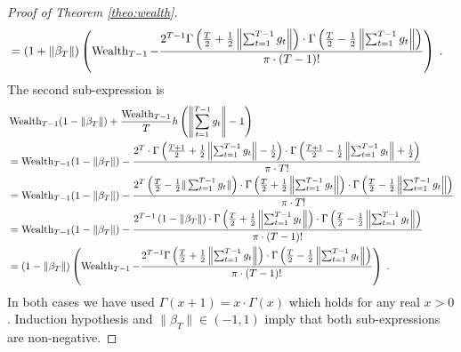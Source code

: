 \begin{proof}[Proof of Theorem \ref{theo:wealth}]
\begin{align*}
& =  (1 + \|\beta_T\|) \left( \operatorname{Wealth}_{T-1} - \frac{2^{T-1} \Gamma \left(\frac{T}{2} + \frac{1}{2}\left\|\sum_{t=1}^{T-1} g_t \right\| \right) \cdot \Gamma \left(\frac{T}{2} - \frac{1}{2} \left\|\sum_{t=1}^{T-1} g_t \right\| \right)}{\pi \cdot (T-1)!} \right) \; .
\end{align*}
The second sub-expression is
\begin{align*}
& \operatorname{Wealth}_{T-1} (1 - \| \beta_T \|) + \frac{\operatorname{Wealth}_{T-1}}{T} h\left(\left\|\sum_{t=1}^{T-1} g_t \right\| - 1 \right) \\
& = \operatorname{Wealth}_{T-1} (1 - \|\beta_T\|) - \frac{2^T \cdot \Gamma \left(\frac{T+1}{2} + \frac{1}{2}\left\|\sum_{t=1}^{T-1} g_t \right\| - \frac{1}{2} \right) \cdot \Gamma \left(\frac{T+1}{2} - \frac{1}{2} \left\|\sum_{t=1}^{T-1} g_t \right\| + \frac{1}{2} \right)}{\pi \cdot T!} \\
& = \operatorname{Wealth}_{T-1} (1 - \|\beta_T\|) - \frac{2^T \left( \frac{T}{2} - \frac{1}{2}\|\sum_{t=1}^{T-1} g_t\| \right) \cdot \Gamma \left(\frac{T}{2} + \frac{1}{2}\left\|\sum_{t=1}^{T-1} g_t \right\| \right) \cdot \Gamma \left(\frac{T}{2} - \frac{1}{2} \left\|\sum_{t=1}^{T-1} g_t \right\| \right)}{\pi \cdot T!} \\
& = \operatorname{Wealth}_{T-1} (1 - \|\beta_T\|) - \frac{2^{T-1} \left( 1 - \|\beta_T\| \right) \cdot \Gamma \left(\frac{T}{2} + \frac{1}{2}\left\|\sum_{t=1}^{T-1} g_t \right\| \right) \cdot \Gamma \left(\frac{T}{2} - \frac{1}{2} \left\|\sum_{t=1}^{T-1} g_t \right\| \right)}{\pi \cdot (T-1)!} \\
& = (1 - \|\beta_T\|) \left( \operatorname{Wealth}_{T-1}  - \frac{2^{T-1} \Gamma \left(\frac{T}{2} + \frac{1}{2}\left\|\sum_{t=1}^{T-1} g_t \right\| \right) \cdot \Gamma \left(\frac{T}{2} - \frac{1}{2} \left\|\sum_{t=1}^{T-1} g_t \right\| \right)}{\pi \cdot (T-1)!} \right) \; .
\end{align*}
In both cases we have used $\Gamma(x+1) = x \cdot \Gamma(x)$ which holds for any
real $x > 0$. Induction hypothesis and $\|\beta_T\| \in (-1,1)$ imply
that both sub-expressions are non-negative.
\end{proof}